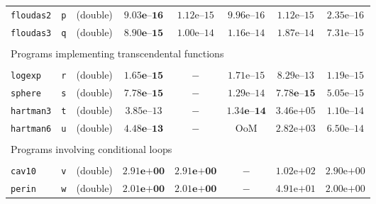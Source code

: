 \begin{tabular}{p{2.3cm}ccccccc}
\multirow{1}{*}{\texttt{floudas2}} & \texttt{p}
& (double) &  $\mathbf{9.03\textbf{e--}16}$ & $1.12\text{e--}15$ & $9.96\text{e--}16$ & $1.12\text{e--}15$ & $2.35\text{e--}16$ \\
\multirow{1}{*}{\texttt{floudas3}} & \texttt{q}
& (double) & $\mathbf{8.90\textbf{e--}15}$ & $1.00\text{e--}14$ & $1.16\text{e--}14$ & $1.87\text{e--}14$ & $7.31\text{e--}15$ \\
\hline
\\
\multicolumn{8}{l}{Programs implementing transcendental functions}\\
\\
\hline
\multirow{1}{*}{\texttt{logexp}} & \texttt{r}
& (double) & $\mathbf{1.65\textbf{e--}15}$ & $-$ & $1.71\text{e--}15$ & $8.29\text{e--}13$ & $1.19\text{e--}15$ \\
\multirow{1}{*}{\texttt{sphere}} & \texttt{s}
& (double) & $\mathbf{7.78\textbf{e--}15}$ & $-$ & $1.29\text{e--}14$ & $\mathbf{7.78\textbf{e--}15}$ & $5.05\text{e--}15$ \\
\multirow{1}{*}{\texttt{hartman3}} & \texttt{t}
& (double) & $3.85\text{e--}13$ & $-$  & $\mathbf{1.34\textbf{e--}14}$ & $3.46\text{e+}05$ & $1.10\text{e--}14$ \\
\multirow{1}{*}{\texttt{hartman6}} & \texttt{u}
& (double) & $\mathbf{4.48\textbf{e--}13}$ & $-$ & $\text{OoM}$ & $2.82\text{e+}03$ & $6.50\text{e--}14$ \\
\hline
\\
\multicolumn{8}{l}{Programs involving conditional loops}    \\
\\
\hline
\multirow{1}{*}{\texttt{cav10}} & \texttt{v}
& (double) & $\mathbf{2.91\textbf{e+}00}$ & $\mathbf{2.91\textbf{e+}00}$ & $-$ & $1.02\text{e+}02$ & $2.90\text{e+}00$ \\
\multirow{1}{*}{\texttt{perin}} & \texttt{w}
& (double) & $\mathbf{2.01\textbf{e+}00}$ & $\mathbf{2.01\textbf{e+}00}$ & $-$ & $4.91\text{e+}01$ & $2.00\text{e+}00$ \\
\hline
\end{tabular}